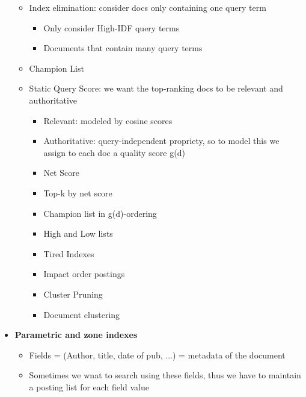 \begin{itemize}
\begin{itemize}
\begin{itemize}
        \end{itemize}
        \item Index elimination: consider docs only containing one query term
        \begin{itemize}
            \item Only consider High-IDF query terms
            \item Documents that contain many query terms
        \end{itemize}
        \item Champion List
        \item Static Query Score: we want the top-ranking docs to be relevant and authoritative
        \begin{itemize}
            \item Relevant: modeled by cosine scores
            \item Authoritative: query-independent propriety, so to model this we assign to each doc a quality score g(d)
            \item Net Score
            \item Top-k by net score
            \item Champion list in g(d)-ordering
            \item High and Low lists
            \item Tired Indexes
            \item Impact order postings
            \item Cluster Pruning
            \item Document clustering
        \end{itemize}
    \end{itemize}
    \item \textbf{Parametric and zone indexes}
    \begin{itemize}
        \item Fields = (Author, title, date of pub, ...) = metadata of the document
        \item Sometimes we wnat to search using these fields, thus we have to maintain a posting list for each field value
    \end{itemize}
\end{itemize}

